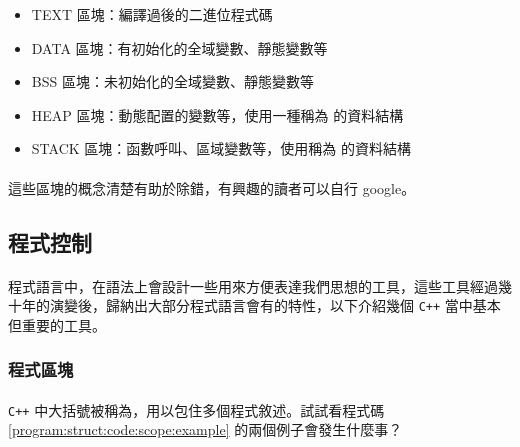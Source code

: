 \documentclass[12pt,a4paper,oneside]{article}
\begin{document}
\begin{CJK}{UTF8}{bkai}
\begin{itemize}
\item TEXT 區塊：編譯過後的二進位程式碼
\item DATA 區塊：有初始化的全域變數、靜態變數等
\item BSS 區塊：未初始化的全域變數、靜態變數等
\item HEAP 區塊：動態配置的變數等，使用一種稱為 的資料結構
\item STACK 區塊：函數呼叫、區域變數等，使用稱為 的資料結構
\end{itemize}

\paragraph{}這些區塊的概念清楚有助於除錯，有興趣的讀者可以自行 google。

\subsection{程式控制}

\paragraph{}程式語言中，在語法上會設計一些用來方便表達我們思想的工具，這些工具經過幾十年的演變後，歸納出大部分程式語言會有的特性，以下介紹幾個 \lstinline!C++! 當中基本但重要的工具。

\subsubsection{程式區塊}

\paragraph{}\lstinline!C++! 中大括號被稱為，用以包住多個程式敘述。試試看程式碼 \ref{program:struct:code:scope:example} 的兩個例子會發生什麼事？


\end{CJK}
\end{document}
